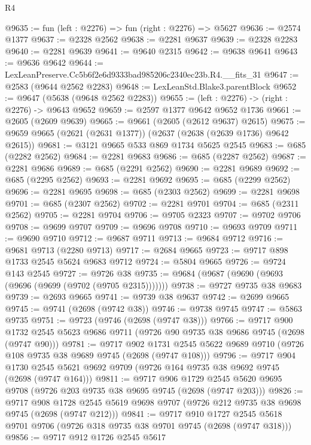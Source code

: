 \begin{lexlean}{R4}
\begin{coremodule}
@9635 := fun (left : @2276) => fun (right : @2276) => @5627
@9636 := @2574 @1377
@9637 := @2328 @2562
@9638 := @2281 @9637
@9639 := @2328 @2283
@9640 := @2281 @9639
@9641 := @9640 @2315
@9642 := @9638 @9641
@9643 := @9636 @9642
@9644 := LexLeanPreserve.Cc5b6f2e6d9333bad985206c2340ec23b.R4.__fits_31
@9647 := @2583 (@9644 @2562 @2283)
@9648 := LexLeanStd.Blake3.parentBlock
@9652 := @9647 (@5638 (@9648 @2562 @2283))
@9655 := (left : @2276) -> (right : @2276) -> @9643 @9652
@9659 := @2597 @1377 @9642 @9652 @1736
@9661 := @2605 (@2609 @9639)
@9665 := @9661 (@2605 (@2612 @9637) @2615)
@9675 := @9659 @9665 (@2621 (@2631 @1377)) (@2637 (@2638 (@2639 @1736) @9642 @2615))
@9681 := @3121 @9665 @533 @869 @1734 @5625 @2545
@9683 := @685 (@2282 @2562)
@9684 := @2281 @9683
@9686 := @685 (@2287 @2562)
@9687 := @2281 @9686
@9689 := @685 (@2291 @2562)
@9690 := @2281 @9689
@9692 := @685 (@2295 @2562)
@9693 := @2281 @9692
@9695 := @685 (@2299 @2562)
@9696 := @2281 @9695
@9698 := @685 (@2303 @2562)
@9699 := @2281 @9698
@9701 := @685 (@2307 @2562)
@9702 := @2281 @9701
@9704 := @685 (@2311 @2562)
@9705 := @2281 @9704
@9706 := @9705 @2323
@9707 := @9702 @9706
@9708 := @9699 @9707
@9709 := @9696 @9708
@9710 := @9693 @9709
@9711 := @9690 @9710
@9712 := @9687 @9711
@9713 := @9684 @9712
@9716 := @9681 @9713 (@2280 @9713)
@9717 := @2684 @9665
@9723 := @9717 @898 @1733 @2545 @5624 @9683 @9712
@9724 := @5804 @9665
@9726 := @9724 @143 @2545
@9727 := @9726 @38
@9735 := @9684 (@9687 (@9690 (@9693 (@9696 (@9699 (@9702 (@9705 @2315)))))))
@9738 := @9727 @9735 @38 @9683
@9739 := @2693 @9665
@9741 := @9739 @38 @9637
@9742 := @2699 @9665
@9745 := @9741 (@2698 (@9742 @38))
@9746 := @9738 @9745
@9747 := @5863 @9735
@9751 := @9723 (@9746 (@2698 (@9747 @38)))
@9766 := @9717
    @900
    @1732
    @2545
    @5623
    @9686
    @9711
    (@9726 @90 @9735 @38 @9686 @9745 (@2698 (@9747 @90)))
@9781 := @9717
    @902
    @1731
    @2545
    @5622
    @9689
    @9710
    (@9726 @108 @9735 @38 @9689 @9745 (@2698 (@9747 @108)))
@9796 := @9717
    @904
    @1730
    @2545
    @5621
    @9692
    @9709
    (@9726 @164 @9735 @38 @9692 @9745 (@2698 (@9747 @164)))
@9811 := @9717
    @906
    @1729
    @2545
    @5620
    @9695
    @9708
    (@9726 @203 @9735 @38 @9695 @9745 (@2698 (@9747 @203)))
@9826 := @9717
    @908
    @1728
    @2545
    @5619
    @9698
    @9707
    (@9726 @212 @9735 @38 @9698 @9745 (@2698 (@9747 @212)))
@9841 := @9717
    @910
    @1727
    @2545
    @5618
    @9701
    @9706
    (@9726 @318 @9735 @38 @9701 @9745 (@2698 (@9747 @318)))
@9856 := @9717
    @912
    @1726
    @2545
    @5617

\end{coremodule}
\end{lexlean}
